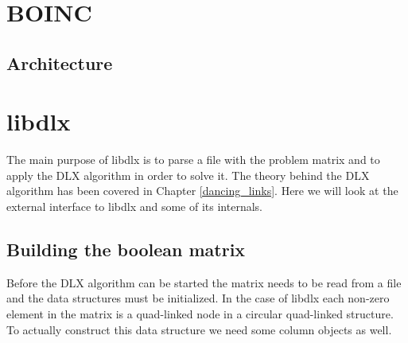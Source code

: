 




\section{BOINC}

\subsection{Architecture}


\section{libdlx}

The main purpose of libdlx is to parse a file with the problem matrix and to apply the DLX algorithm in order to solve it.
The theory behind the DLX algorithm has been covered in Chapter \ref{dancing_links}.
Here we will look at the external interface to libdlx and some of its internals.


\subsection{Building the boolean matrix}

Before the DLX algorithm can be started the matrix needs to be read from a file and the data structures must be initialized.
In the case of libdlx each non-zero element in the matrix is a quad-linked node in a circular quad-linked structure.
To actually construct this data structure we need some column objects as well.

